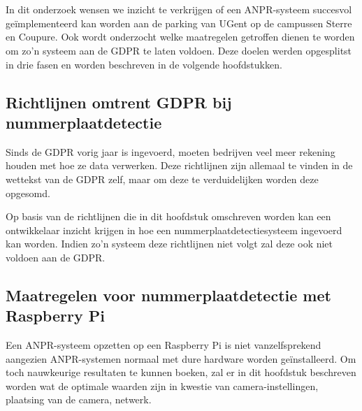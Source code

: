 
\chapter{}
\label{ch:methodologie}


In dit onderzoek wensen we inzicht te verkrijgen of een ANPR-systeem succesvol geïmplementeerd kan worden aan de parking van UGent op de campussen Sterre en Coupure. Ook wordt onderzocht welke maatregelen getroffen dienen te worden om zo'n systeem aan de GDPR te laten voldoen. Deze doelen werden opgesplitst in drie fasen en worden beschreven in de volgende hoofdstukken.

\section{Richtlijnen omtrent GDPR bij nummerplaatdetectie}
Sinds de GDPR vorig jaar is ingevoerd, moeten bedrijven veel meer rekening houden met hoe ze data verwerken. Deze richtlijnen zijn allemaal te vinden in de wettekst van de GDPR zelf, maar om deze te verduidelijken worden deze opgesomd.

Op basis van de richtlijnen die in dit hoofdstuk omschreven worden kan een ontwikkelaar inzicht krijgen in hoe een nummerplaatdetectiesysteem ingevoerd kan worden. Indien zo'n systeem deze richtlijnen niet volgt zal deze ook niet voldoen aan de GDPR. 

\section{Maatregelen voor nummerplaatdetectie met Raspberry Pi}
Een ANPR-systeem opzetten op een Raspberry Pi is niet vanzelfsprekend aangezien ANPR-systemen normaal met dure hardware worden geïnstalleerd. Om toch nauwkeurige resultaten te kunnen boeken, zal er in dit hoofdstuk beschreven worden wat de optimale waarden zijn in kwestie van camera-instellingen, plaatsing van de camera, netwerk.


